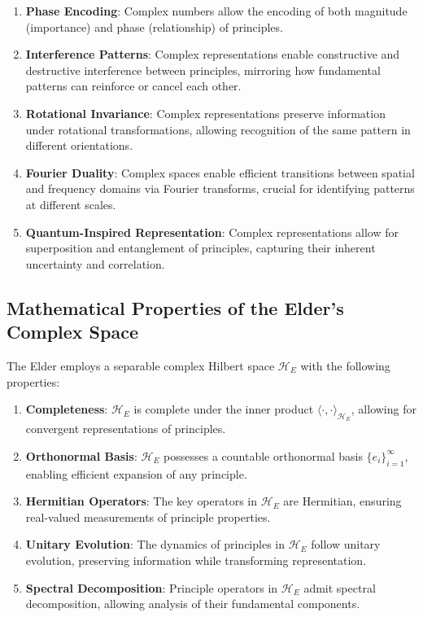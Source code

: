 \begin{enumerate}
\item \textbf{Phase Encoding}: Complex numbers allow the encoding of both magnitude (importance) and phase (relationship) of principles.

\item \textbf{Interference Patterns}: Complex representations enable constructive and destructive interference between principles, mirroring how fundamental patterns can reinforce or cancel each other.

\item \textbf{Rotational Invariance}: Complex representations preserve information under rotational transformations, allowing recognition of the same pattern in different orientations.

\item \textbf{Fourier Duality}: Complex spaces enable efficient transitions between spatial and frequency domains via Fourier transforms, crucial for identifying patterns at different scales.

\item \textbf{Quantum-Inspired Representation}: Complex representations allow for superposition and entanglement of principles, capturing their inherent uncertainty and correlation.
\end{enumerate}

\subsection{Mathematical Properties of the Elder's Complex Space}

The Elder employs a separable complex Hilbert space $\mathcal{H}_E$ with the following properties:

\begin{enumerate}
\item \textbf{Completeness}: $\mathcal{H}_E$ is complete under the inner product $\langle \cdot, \cdot \rangle_{\mathcal{H}_E}$, allowing for convergent representations of principles.

\item \textbf{Orthonormal Basis}: $\mathcal{H}_E$ possesses a countable orthonormal basis $\{e_i\}_{i=1}^{\infty}$, enabling efficient expansion of any principle.

\item \textbf{Hermitian Operators}: The key operators in $\mathcal{H}_E$ are Hermitian, ensuring real-valued measurements of principle properties.

\item \textbf{Unitary Evolution}: The dynamics of principles in $\mathcal{H}_E$ follow unitary evolution, preserving information while transforming representation.

\item \textbf{Spectral Decomposition}: Principle operators in $\mathcal{H}_E$ admit spectral decomposition, allowing analysis of their fundamental components.
\end{enumerate}

